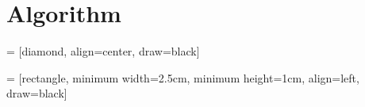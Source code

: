 \chapter{Algorithm}

 = [diamond, align=center, draw=black]

 = [rectangle, minimum width=2.5cm, minimum height=1cm, align=left, draw=black]


%	
%
%
%
%
%

